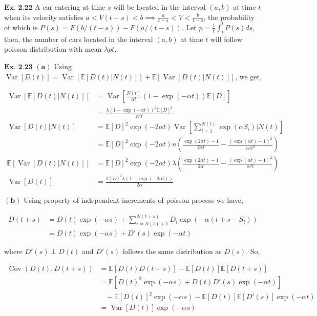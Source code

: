\documentclass{article}
\begin{document}
\vspace{0.2in}
${\textbf{Ex. 2.22}}$
A car entering at time $s$ will be located in the interval $(a,b)$ at time $t$ when its velocity satisfies $a < V(t-s) < b \implies \frac{a}{t-s} < V < \frac{b}{t-s}$, the probability of which is $P(s) = F(b/(t-s)) - F(a/(t-s))$. Let $p = \frac{1}{t}\int_{t}^{t}P(s)ds$, then, the number of cars located in the interval $(a,b)$ at time $t$ will follow poisson distribution with mean $\lambda p t$.

\vspace{0.2in}
${\textbf{Ex. 2.23}}$
$\mathbf{(a)}$ Using $\operatorname{Var}[D(t)] = \operatorname{Var}[\mathbb{E}[D(t)|N(t)]] + \mathbb{E}[\operatorname{Var}[D(t)|N(t)]]$, we get,

\begin{align*}
\operatorname{Var}[\mathbb{E}[D(t)|N(t)]] &= \operatorname{Var}\left[\frac{N(t)}{\alpha t}(1-\exp(-\alpha t))\mathbb{E}[D]\right]\\
&= \frac{\lambda(1-\exp(-\alpha t))^2\mathbb{E}[D]^2}{\alpha^2t}\\
\operatorname{Var}[D(t)|N(t)] &= \mathbb{E}[D]^2\exp(-2\alpha t) \operatorname{Var}\left[\sum_{i=1}^{N(t)}\exp(\alpha S_i)|N(t)\right]\\
&= \mathbb{E}[D]^2\exp(-2\alpha t)n\left(\frac{\exp(2\alpha t) - 1}{2\alpha t} -
 \frac{(\exp(\alpha t)-1)^2}{\alpha^2t^2}\right)\\
\mathbb{E}[\operatorname{Var}[D(t)|N(t)]] &= \mathbb{E}[D]^2\exp(-2\alpha t)\lambda\left(\frac{\exp(2\alpha t) - 1}{2\alpha} -
 \frac{(\exp(\alpha t)-1)^2}{\alpha^2t}\right)\\
\operatorname{Var}[D(t)] &= \frac{\mathbb{E}[D]^2\lambda(1-\exp(-2\alpha t))}{2\alpha}
\end{align*}

$\mathbf{(b)}$ Using property of independent increments of poisson process we have, 

\begin{align*}
D(t+s) &= D(t)\exp(-\alpha s) + \sum_{i=N(t)+1}^{N(t+s)}D_i\exp(-\alpha(t+s-S_i))\\
&= D(t)\exp(-\alpha s) + D'(s)\exp(-\alpha t)
\end{align*}

where $D'(s) \perp D(t)$ and $D'(s)$ follows the same distribution as $D(s)$. So,

\begin{align*}
\operatorname{Cov}(D(t),D(t+s)) &= \mathbb{E}[D(t)D(t+s)] - \mathbb{E}[D(t)]\mathbb{E}[D(t+s)]\\
&= \mathbb{E}[D(t)^2\exp(-\alpha s) + D(t)D'(s)\exp(-\alpha t)] \\
&\ \ \ \ - \mathbb{E}[D(t)]^2\exp(-\alpha s) - \mathbb{E}[D(t)]\mathbb{E}[D'(s)]\exp(-\alpha t)\\
&= \operatorname{Var}[D(t)]\exp(-\alpha s)\\
\end{align*}
\end{document}

